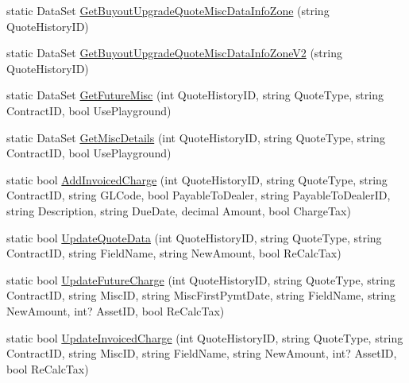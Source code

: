 \begin{DoxyCompactItemize}
\item 
static Data\+Set \mbox{\hyperlink{class_g_f_s_c_1_1_services_1_1_end_of_term_1_1_business_1_1_quote_information_ac87186a3ef46a918f343cc116669fd5a}{Get\+Buyout\+Upgrade\+Quote\+Misc\+Data\+Info\+Zone}} (string Quote\+History\+ID)
\item 
static Data\+Set \mbox{\hyperlink{class_g_f_s_c_1_1_services_1_1_end_of_term_1_1_business_1_1_quote_information_a471a2eefa31b402a2c8d96878f3735b9}{Get\+Buyout\+Upgrade\+Quote\+Misc\+Data\+Info\+Zone\+V2}} (string Quote\+History\+ID)
\item 
static Data\+Set \mbox{\hyperlink{class_g_f_s_c_1_1_services_1_1_end_of_term_1_1_business_1_1_quote_information_ac37cc38cb0a087172577503a1b8dbe11}{Get\+Future\+Misc}} (int Quote\+History\+ID, string Quote\+Type, string Contract\+ID, bool Use\+Playground)
\item 
static Data\+Set \mbox{\hyperlink{class_g_f_s_c_1_1_services_1_1_end_of_term_1_1_business_1_1_quote_information_aefb3431470834760912e5f695ac8a704}{Get\+Misc\+Details}} (int Quote\+History\+ID, string Quote\+Type, string Contract\+ID, bool Use\+Playground)
\item 
static bool \mbox{\hyperlink{class_g_f_s_c_1_1_services_1_1_end_of_term_1_1_business_1_1_quote_information_a6626649b8bb5656489ee90f1704e312a}{Add\+Invoiced\+Charge}} (int Quote\+History\+ID, string Quote\+Type, string Contract\+ID, string G\+L\+Code, bool Payable\+To\+Dealer, string Payable\+To\+Dealer\+ID, string Description, string Due\+Date, decimal Amount, bool Charge\+Tax)
\item 
static bool \mbox{\hyperlink{class_g_f_s_c_1_1_services_1_1_end_of_term_1_1_business_1_1_quote_information_a7e53d4f942fa7324f031d75169dba969}{Update\+Quote\+Data}} (int Quote\+History\+ID, string Quote\+Type, string Contract\+ID, string Field\+Name, string New\+Amount, bool Re\+Calc\+Tax)
\item 
static bool \mbox{\hyperlink{class_g_f_s_c_1_1_services_1_1_end_of_term_1_1_business_1_1_quote_information_acbd750495a03f04ea5010ea3de3cf470}{Update\+Future\+Charge}} (int Quote\+History\+ID, string Quote\+Type, string Contract\+ID, string Misc\+ID, string Misc\+First\+Pymt\+Date, string Field\+Name, string New\+Amount, int? Asset\+ID, bool Re\+Calc\+Tax)
\item 
static bool \mbox{\hyperlink{class_g_f_s_c_1_1_services_1_1_end_of_term_1_1_business_1_1_quote_information_a84306997ff08f23dbeb1404360d922a2}{Update\+Invoiced\+Charge}} (int Quote\+History\+ID, string Quote\+Type, string Contract\+ID, string Misc\+ID, string Field\+Name, string New\+Amount, int? Asset\+ID, bool Re\+Calc\+Tax)

\end{DoxyCompactItemize}
